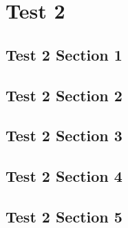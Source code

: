 \chapter{Test 2}
\localtableofcontents
\clearpage

\section{Test 2 Section 1}

\linebreak

\section{Test 2 Section 2}

\linebreak

\section{Test 2 Section 3}

\linebreak

\section{Test 2 Section 4}

\linebreak

\section{Test 2 Section 5}

\linebreak